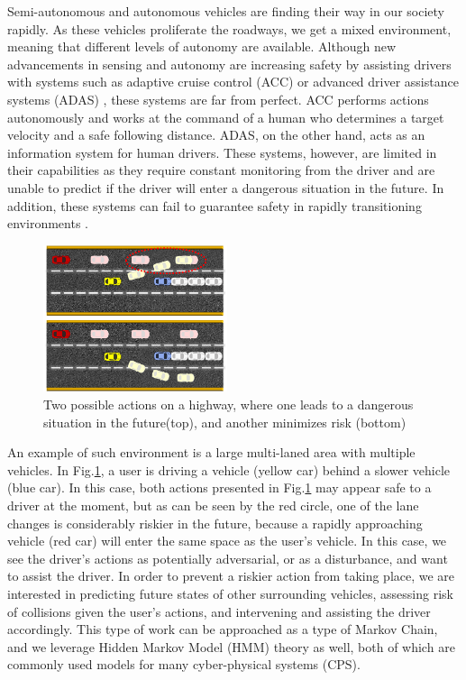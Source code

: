 \documentclass[letterpaper, 10 pt, conference]{ieeeconf}  %
\begin{document}
Semi-autonomous and autonomous vehicles are finding their way in our society rapidly. As these vehicles proliferate the roadways, we get a mixed environment, meaning that different levels of autonomy are available. Although new advancements in sensing and autonomy are increasing safety by assisting drivers with systems such as adaptive cruise control (ACC) \cite{acc} or advanced driver assistance systems (ADAS) \cite{adas}, these systems are far from perfect. ACC performs actions autonomously and works at the command of a human who determines a target velocity and a safe following distance. ADAS, on the other hand, acts as an information system for human drivers. These systems, however, are limited in their capabilities as they require constant monitoring from the driver and are unable to predict if the driver will enter a dangerous situation in the future. In addition, these systems can fail to guarantee safety in rapidly transitioning environments \cite{accfail}.
    

\begin{figure}[ht]
    \includegraphics[width=0.48\textwidth]{highway.png}
    \caption{Two possible actions on a highway, where one leads to a dangerous situation in the future(top), and another minimizes risk (bottom)}
    \label{fig:hiway}
\end{figure}
    
    An example of such environment is a large multi-laned area with multiple vehicles. In Fig.\ref{fig:hiway}, a user is driving a vehicle (yellow car) behind a slower vehicle (blue car). In this case, both actions presented in Fig.\ref{fig:hiway} may appear safe to a driver at the moment, but as can be seen by the red circle, one of the lane changes is considerably riskier in the future, because a rapidly approaching vehicle (red car) will enter the same space as the user's vehicle. In this case, we see the driver's actions as potentially adversarial, or as a disturbance, and want to assist the driver. In order to prevent a riskier action from taking place, we are interested in predicting future states of other surrounding vehicles, assessing risk of collisions given the user's actions, and intervening and assisting the driver accordingly. This type of work can be approached as a type of Markov Chain, and we leverage Hidden Markov Model (HMM) theory as well, both of which are commonly used models for many cyber-physical systems (CPS).
    
\end{document}
